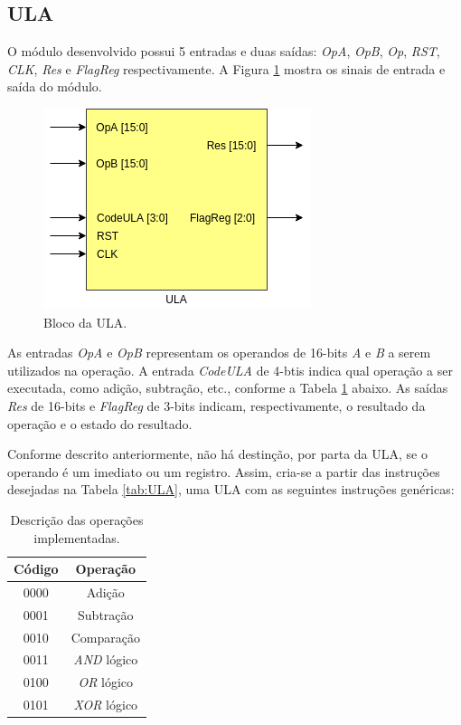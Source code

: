 \documentclass[11pt,a4paper,titlepage]{article}
\begin{document}
\subsection{ULA}\label{subsec:imp-ula}

O módulo desenvolvido possui 5 entradas e duas saídas: \textit{OpA}, \textit{OpB}, \textit{Op}, \textit{RST}, \textit{CLK}, \textit{Res} e \textit{FlagReg} respectivamente. A Figura \ref{fig:blocoula} mostra os sinais de entrada e saída do módulo.

\begin{figure}[h]
\centering
\includegraphics[scale=0.5]{images/ULA_diag.png}
\caption{Bloco da ULA.}
\label{fig:blocoula}
\end{figure}

As entradas \textit{OpA} e \textit{OpB} representam os operandos de 16-bits \textit{A} e \textit{B} a serem utilizados na operação. A entrada \textit{CodeULA} de 4-btis indica qual operação a ser executada, como adição, subtração, etc., conforme a Tabela \ref{tab:imp} abaixo. As saídas \textit{Res} de 16-bits e \textit{FlagReg} de 3-bits indicam, respectivamente, o resultado da operação e o estado do resultado.

Conforme descrito anteriormente, não há destinção, por parta da ULA, se o operando é um imediato ou um registro. Assim, cria-se a partir das instruções desejadas na Tabela \ref{tab:ULA}, uma ULA com as seguintes instruções genéricas:

\begin{table}[h]
\centering
\begin{tabular}{| c | c |}
\hline
Código  & Operação \\
\hline
0000 & Adição\\
\hline
0001 & Subtração\\
\hline
0010 & Comparação\\
\hline
0011 & \textit{AND} lógico\\
\hline
0100 & \textit{OR} lógico\\
\hline
0101 & \textit{XOR} lógico\\
\hline
\end{tabular}
\caption{Descrição das operações implementadas.}
\label{tab:imp}
\end{table}
%
\end{document}
